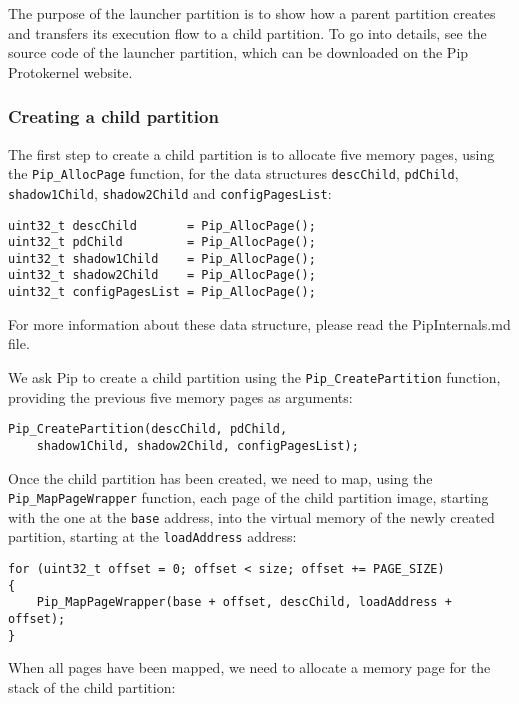\documentclass[10pt,a4paper,titlepage]{refart}
\begin{document}
The purpose of the launcher partition is to show how a parent partition creates
and transfers its execution flow to a child partition. To go into details, see
the source code of the launcher partition, which can be downloaded on the Pip
Protokernel website.

\subsubsection{Creating a child partition}

The first step to create a child partition is to allocate five memory pages,
using the \texttt{Pip\_AllocPage} function, for the data structures
\texttt{descChild}, \texttt{pdChild}, \texttt{shadow1Child},
\texttt{shadow2Child} and \texttt{configPagesList}:

\begin{lstlisting}[style=CStyle]
uint32_t descChild       = Pip_AllocPage();
uint32_t pdChild         = Pip_AllocPage();
uint32_t shadow1Child    = Pip_AllocPage();
uint32_t shadow2Child    = Pip_AllocPage();
uint32_t configPagesList = Pip_AllocPage();
\end{lstlisting}

For more information about these data structure, please read the PipInternals.md
file.

We ask Pip to create a child partition using the \texttt{Pip\_CreatePartition}
function, providing the previous five memory pages as arguments:

\begin{lstlisting}[style=CStyle]
Pip_CreatePartition(descChild, pdChild,
    shadow1Child, shadow2Child, configPagesList);
\end{lstlisting}

Once the child partition has been created, we need to map, using the
\texttt{Pip\_MapPageWrapper} function, each page of the child partition image,
starting with the one at the \texttt{base} address, into the virtual memory of
the newly created partition, starting at the \texttt{loadAddress} address:

\begin{lstlisting}[style=CStyle]
for (uint32_t offset = 0; offset < size; offset += PAGE_SIZE)
{
    Pip_MapPageWrapper(base + offset, descChild, loadAddress + offset);
}
\end{lstlisting}

When all pages have been mapped, we need to allocate a memory page for the stack
of the child partition:
\end{document}
